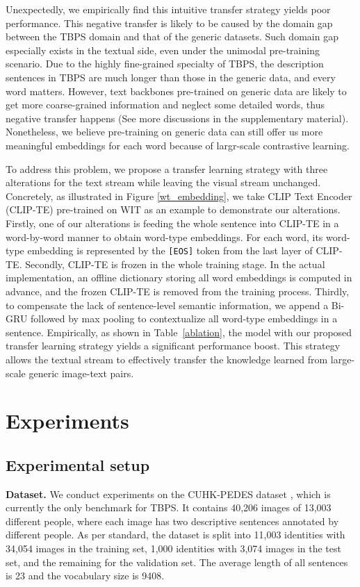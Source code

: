 \documentclass{bmvc2k}
\newcommand{\revision}[1]{#1}
\newcommand{\statement}[1]{\noindent\textbf{#1}}
\begin{document}
Unexpectedly, we empirically find this intuitive transfer strategy yields poor performance. 
This negative transfer is likely to be caused by the domain gap between the TBPS domain and that of the generic datasets. 
\revision{Such domain gap especially exists in the textual side, even under the unimodal pre-training scenario. Due to the highly fine-grained specialty of TBPS, the description sentences in TBPS are much longer than those in the generic data, and every word matters. However, text backbones pre-trained on generic data are likely to get more coarse-grained information and neglect some detailed words, thus negative transfer happens (See more discussions in the supplementary material). Nonetheless, we believe pre-training on generic data can still offer us more meaningful embeddings for each word because of largr-scale contrastive learning.}

To address this problem, we propose a transfer learning strategy with three alterations for the text stream while leaving the visual stream unchanged. 
Concretely, as illustrated in Figure \ref{wt_embedding}, we take CLIP Text Encoder (CLIP-TE) \cite{radford2021clip} pre-trained on WIT as an example to demonstrate our alterations. 
Firstly, one of our alterations is feeding the whole sentence into CLIP-TE in a word-by-word manner to obtain word-type embeddings. 
For each word, its word-type embedding is represented by the \texttt{[EOS]} token from the last layer of CLIP-TE. 
Secondly, CLIP-TE is frozen in the whole training stage. 
In the actual implementation, an offline dictionary storing all word embeddings is computed in advance, and the frozen CLIP-TE is removed from the training process. 
Thirdly, to compensate the lack of sentence-level semantic information, we append a Bi-GRU \cite{cho2014gru} followed by max pooling to contextualize all word-type embeddings in a sentence. 
Empirically, as shown in Table~\ref{ablation}, the model with our proposed transfer learning strategy yields a significant performance boost. 
This strategy allows the textual stream to effectively transfer the knowledge learned from large-scale generic image-text pairs.
 \vspace*{-3mm}
\section{Experiments}
\subsection{Experimental setup}
\statement{Dataset.} We conduct experiments on the CUHK-PEDES dataset \cite{li2017person}, which is currently the only benchmark for TBPS. 
It contains 40,206 images of 13,003 different people, where each image has two descriptive sentences annotated by different people. 
As per standard, the dataset is split into 11,003 identities with 34,054 images in the training set, 1,000 identities with 3,074 images in the test set, and the remaining for the validation set. 
The average length of all sentences is 23 and the vocabulary size is 9408.
\end{document}
